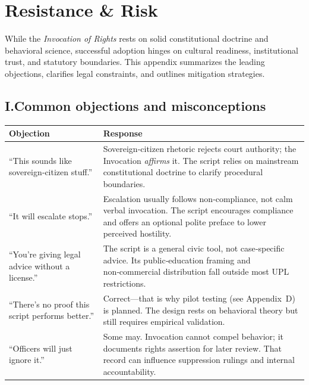 \section{Resistance \& Risk}

While the \textit{Invocation of Rights} rests on solid constitutional doctrine and behavioral science, successful adoption hinges on cultural readiness, institutional trust, and statutory boundaries. This appendix summarizes the leading objections, clarifies legal constraints, and outlines mitigation strategies.

\subsection*{I.\;Common objections and misconceptions}
\begin{longtable}{@{}P{0.38\textwidth}P{0.55\textwidth}@{}}
\toprule
\textbf{Objection} & \textbf{Response}\\
\midrule
``This sounds like sovereign‑citizen stuff.'' & Sovereign‑citizen rhetoric rejects court authority; the Invocation \textit{affirms} it. The script relies on mainstream constitutional doctrine to clarify procedural boundaries.\\[4pt]
``It will escalate stops.'' & Escalation usually follows non‑compliance, not calm verbal invocation. The script encourages compliance and offers an optional polite preface to lower perceived hostility.\\[4pt]
``You’re giving legal advice without a license.'' & The script is a general civic tool, not case‑specific advice. Its public‑education framing and non‑commercial distribution fall outside most UPL restrictions.\\[4pt]
``There’s no proof this script performs better.'' & Correct—that is why pilot testing (see Appendix D) is planned. The design rests on behavioral theory but still requires empirical validation.\\[4pt]
``Officers will just ignore it.'' & Some may. Invocation cannot compel behavior; it documents rights assertion for later review. That record can influence suppression rulings and internal accountability.\\
\bottomrule
\end{longtable}

